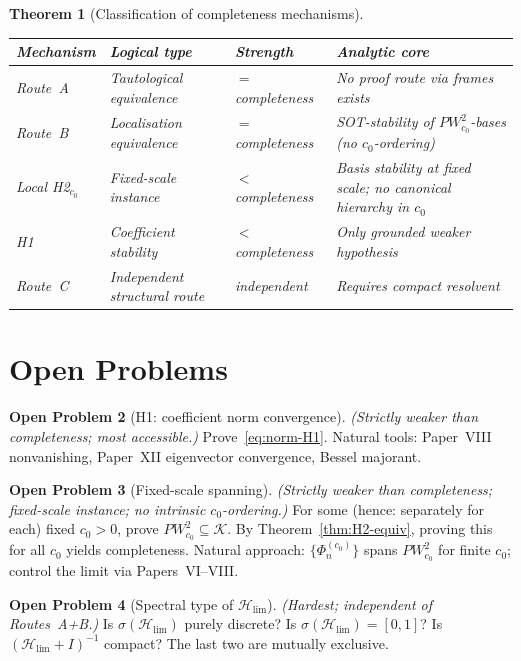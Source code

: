 \documentclass[12pt,a4paper]{amsart}
\newtheorem{theorem}{Theorem}[section]
\theoremstyle{definition}
\newtheorem{problem}[theorem]{Open Problem}
\theoremstyle{remark}
\newcommand{\Hlim}{\mathcal{H}_{\lim}}
\newcommand{\Phic}[2]{\Phi_{#2}^{(#1)}}
\newcommand{\PW}{PW}
\newcommand{\spc}[1]{\sigma(#1)}
\newcommand{\Kspace}{\mathcal{K}}
\begin{document}
\begin{theorem}[Classification of completeness mechanisms]
\label{thm:classification}
\hfill
\begin{center}
\renewcommand{\arraystretch}{1.4}
\begin{tabular}{lllp{4.5cm}}
\toprule
Mechanism & Logical type & Strength & Analytic core \\
\midrule
Route~A & Tautological equivalence
  & $=$ completeness
  & No proof route via frames exists \\
Route~B & Localisation equivalence
  & $=$ completeness
  & SOT-stability of $\PW_{c_0}^2$-bases
    (no $c_0$-ordering) \\
Local H2$_{c_0}$ & Fixed-scale instance
  & $<$ completeness
  & Basis stability at fixed scale;
    no canonical hierarchy in $c_0$ \\
H1 & Coefficient stability
  & $<$ completeness
  & Only grounded weaker hypothesis \\
Route~C & Independent structural route
  & independent
  & Requires compact resolvent \\
\bottomrule
\end{tabular}
\end{center}
\end{theorem}

\section{Open Problems}
\label{sec:open}

\begin{problem}[H1: coefficient norm convergence]
\label{prob:H1}
\emph{(Strictly weaker than completeness; most accessible.)}
Prove~\eqref{eq:norm-H1}.
Natural tools: Paper~VIII nonvanishing,
Paper~XII eigenvector convergence, Bessel majorant.
\end{problem}

\begin{problem}[Fixed-scale spanning]
\label{prob:local-span}
\emph{(Strictly weaker than completeness;
fixed-scale instance; no intrinsic $c_0$-ordering.)}
For some (hence: separately for each) fixed $c_0>0$,
prove $\PW_{c_0}^2\subseteq\Kspace$.
By Theorem~\ref{thm:H2-equiv},
proving this for all $c_0$ yields completeness.
Natural approach: $\{\Phic{c_0}{n}\}$ spans
$\PW_{c_0}^2$ for finite $c_0$; control the limit
via Papers~VI--VIII.
\end{problem}

\begin{problem}[Spectral type of $\Hlim$]
\label{prob:spectral-type}
\emph{(Hardest; independent of Routes~A+B.)}
Is $\spc{\Hlim}$ purely discrete?
Is $\spc{\Hlim}=[0,1]$?
Is $(\Hlim+I)^{-1}$ compact?
The last two are mutually exclusive.
\end{problem}
\end{document}
